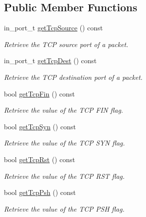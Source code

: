 \subsection*{\-Public \-Member \-Functions}
\begin{DoxyCompactItemize}
\item 
in\-\_\-port\-\_\-t \hyperlink{classIPQ_1_1IpqTcpPacket_a970d80b0be1859f4b2a78d4784295872}{get\-Tcp\-Source} () const 
\begin{DoxyCompactList}\small\item\em \-Retrieve the \-T\-C\-P source port of a packet. \end{DoxyCompactList}\item 
in\-\_\-port\-\_\-t \hyperlink{classIPQ_1_1IpqTcpPacket_ad2fc945448bbfc68a682bf6cd354f35f}{get\-Tcp\-Dest} () const 
\begin{DoxyCompactList}\small\item\em \-Retrieve the \-T\-C\-P destination port of a packet. \end{DoxyCompactList}\item 
bool \hyperlink{classIPQ_1_1IpqTcpPacket_ac6e9e44d3f5059b6e5d17c74f5ab50df}{get\-Tcp\-Fin} () const 
\begin{DoxyCompactList}\small\item\em \-Retrieve the value of the \-T\-C\-P \-F\-I\-N flag. \end{DoxyCompactList}\item 
bool \hyperlink{classIPQ_1_1IpqTcpPacket_a39900fcdcc24d440616ad3ade555c8df}{get\-Tcp\-Syn} () const 
\begin{DoxyCompactList}\small\item\em \-Retrieve the value of the \-T\-C\-P \-S\-Y\-N flag. \end{DoxyCompactList}\item 
bool \hyperlink{classIPQ_1_1IpqTcpPacket_a7cb2b385f6fcd31d34c1e713c9f4221d}{get\-Tcp\-Rst} () const 
\begin{DoxyCompactList}\small\item\em \-Retrieve the value of the \-T\-C\-P \-R\-S\-T flag. \end{DoxyCompactList}\item 
bool \hyperlink{classIPQ_1_1IpqTcpPacket_a666820a105b69e9f01bd5fe7d5acb2da}{get\-Tcp\-Psh} () const 
\begin{DoxyCompactList}\small\item\em \-Retrieve the value of the \-T\-C\-P \-P\-S\-H flag. \end{DoxyCompactList}\item 

\end{DoxyCompactItemize}
